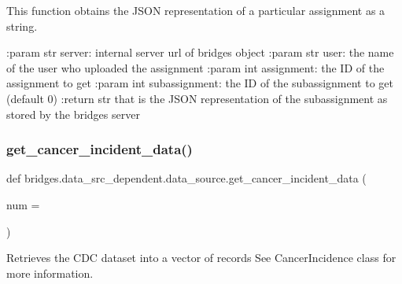 This function obtains the J\+S\+ON representation of a particular assignment as a string. 

\+:param str server\+: internal server url of bridges object \+:param str user\+: the name of the user who uploaded the assignment \+:param int assignment\+: the ID of the assignment to get \+:param int subassignment\+: the ID of the subassignment to get (default 0) \+:return str that is the J\+S\+ON representation of the subassignment as stored by the bridges server \mbox{\label{namespacebridges_1_1data__src__dependent_1_1data__source_ac711dee7446daedd503ce0f091a5f85e}} 
\subsubsection{\texorpdfstring{get\+\_\+cancer\+\_\+incident\+\_\+data()}{get\_cancer\_incident\_data()}}
{\footnotesize\ttfamily def bridges.\+data\+\_\+src\+\_\+dependent.\+data\+\_\+source.\+get\+\_\+cancer\+\_\+incident\+\_\+data (\begin{DoxyParamCaption}\item[{}]{num = {} }\end{DoxyParamCaption})}



Retrieves the C\+DC dataset into a vector of records See Cancer\+Incidence class for more information. 

\mbox{\label{namespacebridges_1_1data__src__dependent_1_1data__source_a87295c22accd698a4573e9f4287c4096}} 
